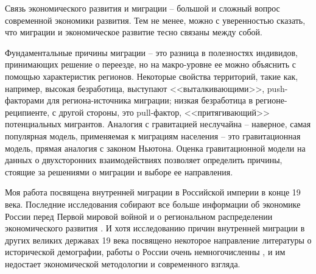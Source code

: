 \documentclass[a4paper,12pt]{article}
\begin{document}

Связь экономического развития и миграции -- большой и сложный вопрос современной экономики развития.
Тем не менее, можно с уверенностью сказать, что миграции и экономическое развитие тесно связаны между собой.

Фундаментальные причины миграции -- это разница в полезностях индивидов, принимающих решение о переезде, но на макро-уровне ее можно объяснить с помощью характеристик регионов. 
Некоторые свойства территорий, такие как, например, высокая безработица, выступают <<выталкивающими>>, push-факторами для региона-источника миграции; низкая безработица в регионе-реципиенте, с другой стороны, это pull-фактор, <<притягивающий>> потенциальных мигрантов. Аналогия с гравитацией неслучайна -- наверное, самая популярная модель, применяемая к миграциям населения -- это гравитационная модель, прямая аналогия с законом Ньютона. Оценка гравитационной модели на данных о двухсторонних взаимодействиях позволяет определить причины, стоящие за решениями о миграции и выборе ее направления.

Моя работа посвящена внутренней миграции в Российской империи в конце 19 века. Последние исследования собирают все больше информации об экономике России перед Первой мировой войной \citep{markevich_abolition_2018, cheremukhin_industrialization_2017} и о региональном распределении экономического развития \citep{markevich_regional_2019, lindert_inequality_2014}.
И хотя исследованию причин внутренней миграции в других великих державах 19 века посвящено некоторое направление литературы о исторической демографии, работы о России очень немногочисленны \citep{anderson_internal_1980, leasure_internal_1968}, и им недостает экономической методологии и современного взгляда.
\end{document}
